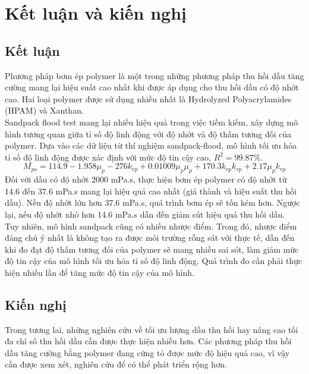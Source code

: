 \documentclass[12pt,a4paper]{article}
\begin{document}
\section{Kết luận và kiến nghị}
	\subsection{Kết luận}
	Phương pháp bơm ép polymer là một trong những phương pháp thu hồi dầu tăng cường mang lại hiệu suất cao nhất khi được áp dụng cho thu hồi dầu có độ nhớt cao. Hai loại polymer được sử dụng nhiều nhất là Hydrolyzed Polyacrylamides (HPAM) và Xanthan.\\
	Sandpack flood test mang lại nhiều hiệu quả trong việc tiềm kiếm, xây dựng mô hình tương quan giữa tỉ số độ linh động với độ nhớt và độ thấm tương đối của polymer. Dựa vào các dữ liệu từ thí nghiệm sandpack-flood, mô hình tối ưu hóa tỉ số độ linh động được xác định với mức độ tin cậy cao, $R^2=99.87\%$.
		\begin{equation}
		M_{po}=114.9-1.958\mu_p-276k_{rp}+0.01009\mu_p\mu_p+170.3k_{rp}k_{rp}+2.17\mu_pk_{rp}
		\end{equation}
	Đối với dầu có độ nhớt 2000 mPa.s, thực hiện bơm ép polymer có độ nhớt từ 14.6 đến 37.6 mPa.s mang lại hiệu quả cao nhất (giá thành và hiệu suất thu hồi dầu). Nếu độ nhớt lớn hơn 37.6 mPa.s, quá trình bơm ép sẽ tốn kém hơn. Ngược lại, nếu độ nhớt nhỏ hơn 14.6 mPa.s dẫn đến giảm sút hiệu quả thu hồi dầu.\\
	Tuy nhiên, mô hình sandpack cũng có nhiều nhược điểm. Trong đó, nhược điểm đáng chú ý nhất là không tạo ra được môi trường rỗng sát với thực tế, dẫn đến khi đo đạt độ thấm tương đối của polymer sẽ mang nhiều sai sót, làm giảm mức độ tin cậy của mô hình tối ưu hóa tỉ số độ linh động. Quá trình đo cần phải thực hiện nhiều lần để tăng mức độ tin cậy của mô hình. 
	\subsection{Kiến nghị}
	Trong tương lai, những nghiên cứu về tối ưu lượng dầu thu hồi hay nâng cao tối đa chỉ số thu hồi dầu cần được thực hiện nhiều hơn. Các phương pháp thu hồi dầu tăng cường bằng polymer đang cứng tỏ được mức độ hiệu quả cao, vì vậy cần được xem xét, nghiên cứu để có thể phát triển rộng hơn.
	\newpage



\end{document}
